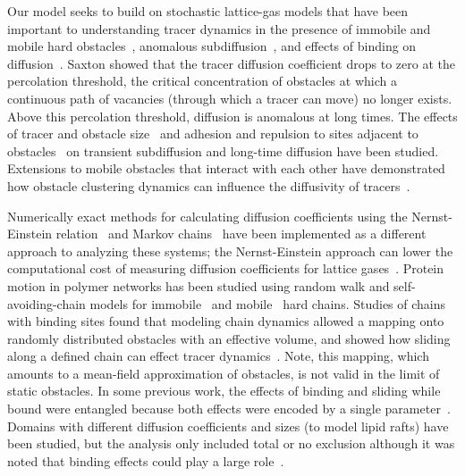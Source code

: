 Our model seeks to build on stochastic lattice-gas models that have been
important to understanding tracer dynamics in the presence of immobile and
mobile hard obstacles~\cite{saxton_lateral_87}, anomalous
subdiffusion~\cite{saxton_anomalous_94}, and effects of binding on
diffusion~\cite{saxton_anomalous_96}. Saxton showed that the tracer diffusion
coefficient drops to zero at the percolation threshold, the critical
concentration of obstacles at which a continuous path of vacancies (through which
a tracer can move) no longer exists. Above this percolation threshold, diffusion
is anomalous at long times.  The effects of tracer and obstacle
size~\cite{ellery_characterizing_14,ellery_calculating_15,ellery_modeling_16}
and adhesion and repulsion to sites adjacent to
obstacles~\cite{ellery_analytical_16} on transient subdiffusion and long-time
diffusion have been studied. Extensions to mobile obstacles that interact with
each other have demonstrated how obstacle clustering dynamics can influence the
diffusivity of tracers~\cite{nandigrami_gradientdriven_17}. 

Numerically exact methods for calculating diffusion coefficients using the
Nernst-Einstein relation~\cite{mercier_numerically_99, mercier_numerically_99a}
and Markov chains~\cite{ellery_communication_16} have been implemented as a
different approach to analyzing these systems; the Nernst-Einstein approach can
lower the computational cost of measuring diffusion coefficients for lattice
gases~\cite{ellery_calculating_15}.  Protein motion in polymer networks has been
studied using random walk and self-avoiding-chain models for
immobile~\cite{wedemeier_modeling_07} and mobile~\cite{wedemeier_how_09,
  wedemeier_anomalous_09} hard chains. Studies of chains with binding sites
found that modeling chain dynamics allowed a mapping onto randomly distributed
obstacles with an effective volume, and showed how sliding along a defined chain
can effect tracer dynamics~\cite{wedemeier_role_08, wedemeier_anomalous_09}.
Note, this mapping, which amounts to a mean-field approximation of obstacles, is
not valid in the limit of static obstacles. In some previous work, the effects
of binding and sliding while bound were entangled because both effects were
encoded by a single parameter~\cite{wedemeier_role_08, wedemeier_anomalous_09}.
Domains with different diffusion coefficients and sizes (to model lipid rafts)
have been studied, but the analysis only included total or no exclusion although
it was noted that binding effects could play a large
role~\cite{nicolau_sources_07}.

